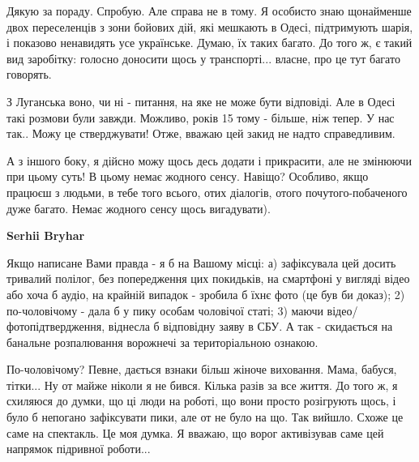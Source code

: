 \begin{itemize}
\begin{itemize}
 

Дякую за пораду. Спробую. Але справа не в тому. Я особисто знаю щонайменше двох
переселенців з зони бойових дій, які мешкають в Одесі, підтримують шарія, і
показово ненавидять усе українське. Думаю, їх таких багато. До того ж, є такий
вид заробітку: голосно доносити щось у транспорті... власне, про це тут багато
говорять. 

З Луганська воно, чи ні - питання, на яке не може бути відповіді. Але в Одесі
такі розмови були завжди. Можливо, років 15 тому - більше, ніж тепер. У нас
так.. Можу це стверджувати! Отже, вважаю цей закид не надто справедливим. 

А з іншого боку, я дійсно можу щось десь додати і прикрасити, але не змінюючи
при цьому суть! В цьому немає жодного сенсу. Навіщо? Особливо, якщо працюєш з
людьми, в тебе того всього, отих діалогів, отого почутого-побаченого дуже
багато. Немає жодного сенсу щось вигадувати).

 
\textbf{Serhii Bryhar} 

Якщо написане Вами правда - я б на Вашому місці: а) зафіксувала цей досить
тривалий полілог, без попередження цих покидьків, на смартфоні у вигляді відео
або хоча б аудіо, на крайній випадок - зробила б їхнє фото (це був би доказ);
2) по-чоловічому - дала б у пику особам чоловічої статі; 3) маючи
відео/фотопідтвердження, віднесла б відповідну заяву в СБУ. А так - скидається
на банальне розпалювання ворожнечі за територіальною ознакою.


 

По-чоловічому? Певне, дається взнаки більш жіноче виховання. Мама, бабуся,
тітки... Ну от майже ніколи я не бився. Кілька разів за все життя. До того ж, я
схиляюся до думки, що ці люди на роботі, що вони просто розігрують щось, і було
б непогано зафіксувати пики, але от не було на що. Так вийшло. Схоже це саме на
спектакль. Це моя думка. Я вважаю, що ворог активізував саме цей напрямок
підривної роботи... 


\end{itemize}
\end{itemize}
